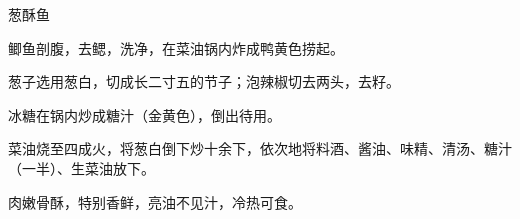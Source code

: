 %
%
%
%
%
%
%
\begin{recipe}{葱酥鱼}

\ingredients


\preparation

\step 鲫鱼剖腹，去鳃，洗净，在菜油锅内炸成鸭黄色捞起。

\step 葱子选用葱白，切成长二寸五的节子；泡辣椒切去两头，去籽。

\step 冰糖在锅内炒成糖汁（金黄色），倒出待用。

\step 菜油烧至四成火，将葱白倒下炒十余下，依次地将料酒、酱油、味精、清汤、糖汁
（一半）、生菜油放下。

\features

肉嫩骨酥，特别香鲜，亮油不见汁，冷热可食。

\end{recipe}

